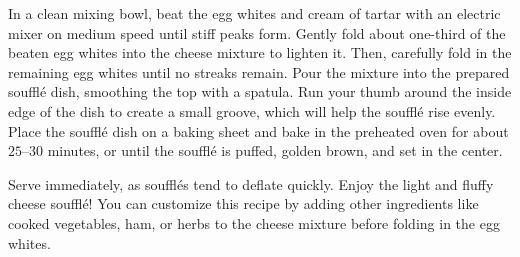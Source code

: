 In a clean mixing bowl, beat the egg whites and cream of tartar with an electric mixer on medium speed until stiff peaks form. Gently fold about one-third of the beaten egg whites into the cheese mixture to lighten it. Then, carefully fold in the remaining egg whites until no streaks remain. Pour the mixture into the prepared soufflé dish, smoothing the top with a spatula. Run your thumb around the inside edge of the dish to create a small groove, which will help the soufflé rise evenly. Place the soufflé dish on a baking sheet and bake in the preheated oven for about $25$--$30$ minutes, or until the soufflé is puffed, golden brown, and set in the center.

Serve immediately, as soufflés tend to deflate quickly. Enjoy the light and fluffy cheese soufflé! You can customize this recipe by adding other ingredients like cooked vegetables, ham, or herbs to the cheese mixture before folding in the egg whites.
